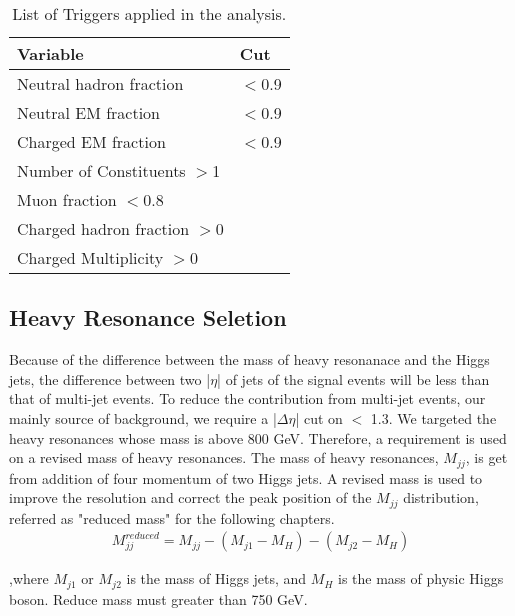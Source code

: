 \begin{table}[h!]
  \begin{center}
    \begin{tabular}{ll}
    Variable & Cut \\
    \hline
    Neutral hadron fraction & $<$0.9 \\
    Neutral EM fraction & $<$0.9 \\
    Charged EM fraction & $<$0.9 \\
    Number of Constituents $>$1 \\
    Muon fraction $<$0.8 \\
    Charged hadron fraction $>$0 \\
    Charged Multiplicity $>$0 \\
	\hline
    \end{tabular}
  \end{center}

  \caption{List of Triggers applied in the analysis.}
  \end{table}

\subsection{Heavy Resonance Seletion} 
Because of the difference between the mass of heavy resonanace and the Higgs jets, the difference between two |$\eta $| of jets of the signal events will be less than that of multi-jet events. To reduce the contribution from multi-jet events, our mainly source of background, we require a |$\Delta \eta $| cut on $<$ 1.3. 
We targeted the heavy resonances whose mass is above 800 GeV. Therefore, a requirement is used on a revised mass of heavy resonances. The mass of heavy resonances, $M_{jj}$, is get from addition of four momentum of two Higgs jets. A revised mass is used to improve the resolution and correct the peak position of the $M_{jj}$ distribution, referred as "reduced mass" for the following chapters.
\begin{equation} \label{eq4}
\begin{split}
M^{reduced}_{jj} = M_{jj} - (M_{j1} - M_{H} ) - (M_{j2} - M_{H} )
\end{split}
\end{equation}

,where $M_{j1}$ or $M_{j2}$ is the mass of Higgs jets, and $M_{H}$ is the mass of physic Higgs boson. Reduce mass must greater than 750 GeV. 

